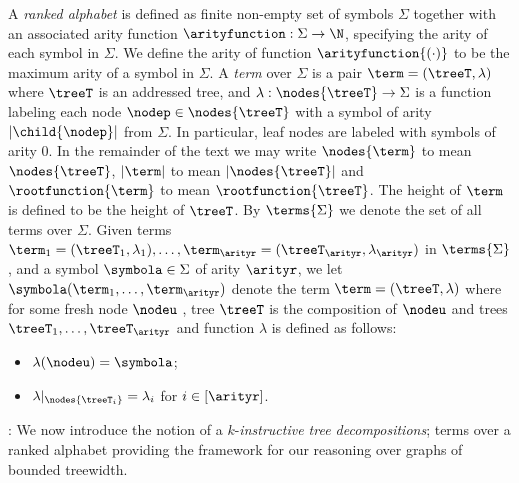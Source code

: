 A \emph{ranked alphabet} is defined as finite non-empty set of symbols $\Sigma$ together with an associated arity function $\arityfunction : \Sigma \rightarrow \N$, specifying the arity of each symbol in $\Sigma$. We define the arity of function $\arityfunction{(\cdot)}$ to be the maximum arity of a symbol in $\Sigma$. A \emph{term} over $\Sigma$ is a pair $\term = (\treeT, \lambda)$ where $\treeT$ is an addressed tree, and $\lambda: \nodes{\treeT} \rightarrow \Sigma$ is a function labeling each node $\nodep \in \nodes{\treeT}$ with a symbol of arity $|\child{\nodep}|$ from $\Sigma$. In particular, leaf nodes are labeled with symbols of arity $0$. In the remainder of the text we may write $\nodes{\term}$ to mean $\nodes{\treeT}$, $|\term|$ to mean $|\nodes{\treeT}|$ and $\rootfunction{\term}$ to mean $\rootfunction{\treeT}$. The height of $\term$ is defined to be the height of $\treeT$. By $\terms{\Sigma}$ we denote the set of all terms over $\Sigma$. Given terms $\term_1 = (\treeT_1,\lambda_1), \ldots,\term_\arityr=(\treeT_\arityr,\lambda_\arityr)$ in $\terms{\Sigma}$, and a symbol $\symbola \in \Sigma$ of arity $\arityr$, we let $\symbola(\term_1, \ldots, \term_{\arityr})$ denote the term $\term = (\treeT, \lambda)$ where for some fresh node $\nodeu$ , tree $\treeT$ is the composition of $\nodeu$ and trees $\treeT_1, \ldots, \treeT_\arityr$ and function  $\lambda$ is defined as follows:
\begin{itemize}
    \item $\lambda(\nodeu) = \symbola$;
    \item   $\lambda|_{\nodes{\treeT_i}} = \lambda_i$ for $i \in [\arityr]$.
\end{itemize}


:
We now introduce the notion of a $k$-\emph{instructive tree decompositions}; terms over a ranked alphabet providing the framework for our reasoning over graphs of bounded treewidth.

